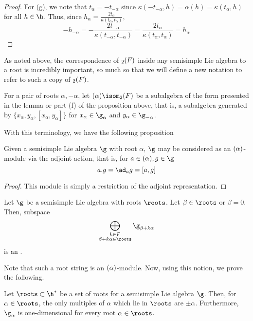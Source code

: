 \documentclass[11pt,leqno,oneside]{amsart}
\numberwithin{thm}{section}
\begin{document}
\begin{proof}
  For (g), we note that \(t_\alpha = -t_{-\alpha}\) since
  \(\kappa(-t_{-\alpha}, h) = \alpha(h) = \kappa(t_\alpha, h)\) for
  all \(h \in \h\). Thus, since \(h_\alpha =
  \frac{2t_\alpha}{\kappa(t_\alpha, t_\alpha)}\), \[
    -h_{-\alpha} =
    -\frac{2t_{-\alpha}}{\kappa(t_{-\alpha},t_{-\alpha})} =
    \frac{2t_\alpha}{\kappa(t_\alpha, t_\alpha)} = h_\alpha
  \]
\end{proof}
As noted above, the correspondence of \(\sl_2(F)\) inside any semisimple
Lie algebra to a root is incredibly important, so much so that we will
define a new notation to refer to such a copy of \(\sl_2(F)\).
\begin{defn}
  For a pair of roots \(\alpha, -\alpha\), let \(\sl(\alpha) \isom
  \sl_2(F)\) be a subalgebra of the form presented in the lemma or
  part (f) of the proposition above, that is, a subalgebra generated
  by \(\{x_\alpha, y_\alpha, [x_\alpha,y_\alpha]\}\) for \(x_\alpha
  \in \g_\alpha\) and \(y_\alpha \in \g_{-\alpha}\).
\end{defn}
With this terminology, we have the following proposition
\begin{prop}
  Given a semisimple Lie algebra \(\g\) with root \(\alpha\), \(\g\)
  may be considered as an \(\sl(\alpha)\)-module via the adjoint
  action, that is, for \(a \in \sl(\alpha), g \in \g\) \[
    a.g = \ad_a g = [a,g]
  \]
\end{prop}
\begin{proof}
  This module is simply a restriction of the adjoint representation.
\end{proof}
\begin{defn}
  Let \(\g\) be a semisimple Lie algebra with roots \(\roots\). Let
  \(\beta \in \roots\) or \(\beta = 0\). Then, subspace \[
    \bigoplus_{\substack{k \in F \\ \beta + k \alpha \in \roots}} \g_{\beta + k \alpha}
  \]
  is an .
\end{defn}
Note that such a root string is an \(\sl(\alpha)\)-module. Now, using
this notion, we prove the following.
\begin{lem}\label{only-multiples-of-root-are-pm}
  Let \(\roots \subset \h^*\) be a set of roots for a semisimple Lie
  algebra \(\g\). Then, for \(\alpha \in \roots\), the only multiples
  of \(\alpha\) which lie in \(\roots\) are \(\pm
  \alpha\). Furthermore, \(\g_{\alpha}\) is one-dimensional for every
  root \(\alpha \in \roots\).
\end{lem}
\end{document}
